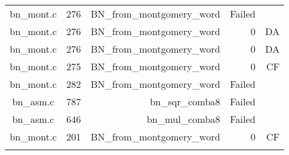 \begin{table}[h]
{\begin{tabular}{clrrr}
bn\_mont.c&276&BN\_from\_montgomery\_word&Failed&\\
bn\_mont.c&276&BN\_from\_montgomery\_word&0 &DA\\
bn\_mont.c&276&BN\_from\_montgomery\_word&0 &DA\\
bn\_mont.c&275&BN\_from\_montgomery\_word&0 &CF\\
bn\_mont.c&282&BN\_from\_montgomery\_word&Failed&\\
bn\_asm.c&787&bn\_sqr\_comba8&Failed&\\
bn\_asm.c&646&bn\_mul\_comba8&Failed&\\
bn\_mont.c&201&BN\_from\_montgomery\_word&0 &CF\\
&&&&\\
\hline
\end{tabular}
}
\end{table}